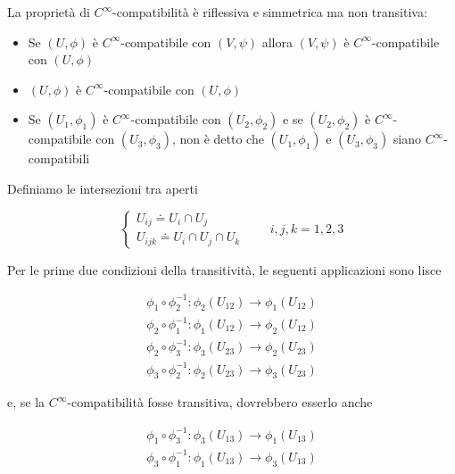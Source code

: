\begin{remark}
	La proprietà di $ C^{\infty} $-compatibilità è riflessiva e simmetrica ma non transitiva:
	
	\begin{itemize}
		\item Se $ (U,\phi) $ è $ C^{\infty} $-compatibile con $ (V,\psi) $ allora $ (V,\psi) $ è $ C^{\infty} $-compatibile con $ (U,\phi) $
		
		\item $ (U,\phi) $ è $ C^{\infty} $-compatibile con $ (U,\phi) $
		
		\item Se $ (U_{1},\phi_{1}) $ è $ C^{\infty} $-compatibile con $ (U_{2},\phi_{2}) $ e se $ (U_{2},\phi_{2}) $ è $ C^{\infty} $-compatibile con $ (U_{3},\phi_{3}) $, non è detto che $ (U_{1},\phi_{1}) $ e $ (U_{3},\phi_{3}) $ siano $ C^{\infty} $-compatibili
	\end{itemize}
\end{remark}

Definiamo le intersezioni tra aperti

\begin{equation}
	\begin{cases}
		U_{ij} \doteq U_{i} \cap U_{j}\\
		U_{ijk} \doteq U_{i} \cap U_{j} \cap U_{k}
	\end{cases}%
	\qquad i,j,k=1,2,3
\end{equation}

Per le prime due condizioni della transitività, le seguenti applicazioni sono lisce

\begin{gather}
	\phi_{1} \circ \phi_{2}^{-1} : \phi_{2}(U_{12}) \to \phi_{1}(U_{12})\\
	\phi_{2} \circ \phi_{1}^{-1} : \phi_{1}(U_{12}) \to \phi_{2}(U_{12})\\
	\phi_{2} \circ \phi_{3}^{-1} : \phi_{3}(U_{23}) \to \phi_{2}(U_{23})\\
	\phi_{3} \circ \phi_{2}^{-1} : \phi_{2}(U_{23}) \to \phi_{3}(U_{23})
\end{gather}

e, se la $ C^{\infty} $-compatibilità fosse transitiva, dovrebbero esserlo anche

\begin{gather}
	\phi_{1} \circ \phi_{3}^{-1} : \phi_{3}(U_{13}) \to \phi_{1}(U_{13})\\
	\phi_{3} \circ \phi_{1}^{-1} : \phi_{1}(U_{13}) \to \phi_{3}(U_{13})
\end{gather}

